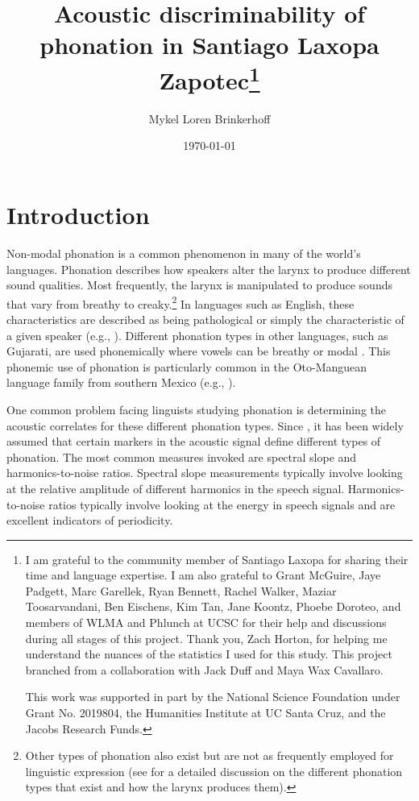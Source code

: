 \documentclass[12pt, letterpaper]{article}
\title{Acoustic discriminability of phonation in Santiago Laxopa Zapotec\thanks{I am grateful to the community member of Santiago Laxopa for sharing their time and language expertise. I am also grateful to Grant McGuire, Jaye Padgett, Marc Garellek, Ryan Bennett, Rachel Walker, Maziar Toosarvandani, Ben Eischens, Kim Tan, Jane Koontz, Phoebe Doroteo, and members of WLMA and Phlunch at UCSC for their help and discussions during all stages of this project. Thank you, Zach Horton, for helping me understand the nuances of the statistics I used for this study. This project branched from a collaboration with Jack Duff and Maya Wax Cavallaro.

This work was supported in part by the National Science Foundation under Grant No. 2019804, the Humanities Institute at UC Santa Cruz, and the Jacobs Research Funds.}}
\author{Mykel Loren Brinkerhoff}
\date{\today}
\begin{document}
	

    \onehalfspacing

\maketitle

\tableofcontents

\section{Introduction} \label{sec:Introduction}
Non-modal phonation is a common phenomenon in many of the world's languages. Phonation describes how speakers alter the larynx to produce different sound qualities. Most frequently, the larynx is manipulated to produce sounds that vary from breathy to creaky.\footnote{Other types of phonation also exist but are not as frequently employed for linguistic expression (see \cite{eslingVoiceQualityLaryngeal2019} for a detailed discussion on the different phonation types that exist and how the larynx produces them).} In languages such as English, these characteristics are described as being pathological or simply the characteristic of a given speaker (e.g., \cite{klattAnalysisSynthesisPerception1990}). Different phonation types in other languages, such as Gujarati, are used phonemically where vowels can be breathy or modal \citep{fischer-jorgensenPhoneticAnalysisBreathy1968}. This phonemic use of phonation is particularly common in the Oto-Manguean language family from southern Mexico (e.g., \cite{suarezMesoamericanIndianLanguages1983,campbellMesoAmericaLinguisticArea1986,silvermanLaryngealComplexityOtomanguean1997,campbellOtomangueanHistoricalLinguistics2017a,campbellOtomangueanHistoricalLinguistics2017}).

One common problem facing linguists studying phonation is determining the acoustic correlates for these different phonation types. Since \citet{fischer-jorgensenPhoneticAnalysisBreathy1968}, it has been widely assumed that certain markers in the acoustic signal define different types of phonation. The most common measures invoked are spectral slope and harmonics-to-noise ratios. Spectral slope measurements typically involve looking at the relative amplitude of different harmonics in the speech signal. Harmonics-to-noise ratios typically involve looking at the energy in speech signals and are excellent indicators of periodicity. 
\end{document}
